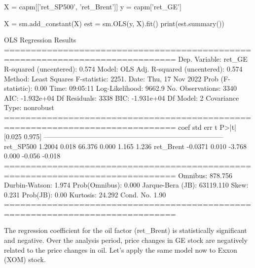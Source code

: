 \begin{ipython}
X = capm[['ret_SP500', 'ret_Brent']]
y = capm['ret_GE']

X = sm.add_constant(X)
est = sm.OLS(y, X).fit()
print(est.summary())
\end{ipython} 
\begin{ioutput}
                           OLS Regression Results                                
==============================================================================
Dep. Variable:                 ret_GE   R-squared (uncentered):          0.574
Model:                            OLS   Adj. R-squared (uncentered):     0.574
Method:                 Least Squares   F-statistic:                     2251.
Date:                Thu, 17 Nov 2022   Prob (F-statistic):               0.00
Time:                        09:05:11   Log-Likelihood:                 9662.9
No. Observations:                3340   AIC:                        -1.932e+04
Df Residuals:                    3338   BIC:                        -1.931e+04
Df Model:                           2                                                  
Covariance Type:            nonrobust                                                  
==============================================================================
                 coef    std err          t      P>|t|      [0.025      0.975]
------------------------------------------------------------------------------
ret_SP500      1.2004      0.018     66.376      0.000       1.165       1.236
ret_Brent     -0.0371      0.010     -3.768      0.000      -0.056      -0.018
==============================================================================
Omnibus:                      878.756   Durbin-Watson:                   1.974
Prob(Omnibus):                  0.000   Jarque-Bera (JB):            63119.110
Skew:                           0.231   Prob(JB):                         0.00
Kurtosis:                      24.292   Cond. No.                         1.90
==============================================================================
\end{ioutput}

The regression coefficient for the oil factor (ret\_Brent) is statistically significant and negative. Over the analysis period, price changes in GE stock are negatively related to the price changes in oil.
Let's apply the same model now to Exxon (XOM) stock.

